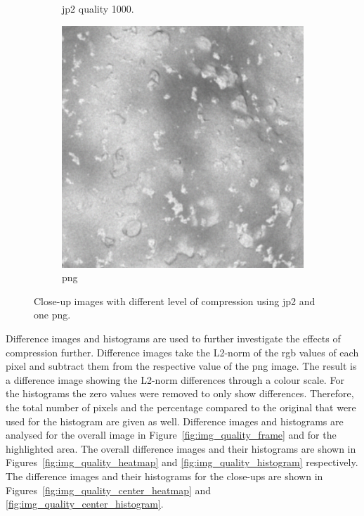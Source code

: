 \begin{figure}[htb]
\begin{subfigure}[b]{0.44\textwidth}
            \caption{\gls{jp2} quality 1000.}
            \label{fig:img_quality_1000}
        \end{subfigure}
        \begin{subfigure}[b]{0.44\textwidth}
            \centering
            \includegraphics[width=\textwidth]{doc/thesis/0_figures/compare_quality/set1/png_center.png}
            \caption{\gls{png}}
            \label{fig:img_quality_png}
        \end{subfigure}
    \caption{Close-up images with different level of compression using \gls{jp2} and one \gls{png}.}
    \label{fig:img_quality_comp}
\end{figure}

Difference images and histograms are used to further investigate the effects of compression further. Difference images take the L2-norm of the \gls{rgb} values of each pixel and subtract them from the respective value of the \gls{png} image. The result is a difference image showing the L2-norm differences through a colour scale. For the histograms the zero values were removed to only show differences. Therefore, the total number of pixels and the percentage compared to the original that were used for the histogram are given as well. Difference images and histograms are analysed for the overall image in Figure~\ref{fig:img_quality_frame} and for the highlighted area. The overall difference images and their histograms are shown in Figures~\ref{fig:img_quality_heatmap} and \ref{fig:img_quality_histogram} respectively. The difference images and their histograms for the close-ups are shown in Figures~\ref{fig:img_quality_center_heatmap} and \ref{fig:img_quality_center_histogram}.

